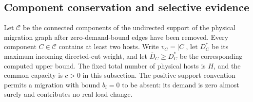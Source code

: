 \documentclass[11pt]{article}
\begin{document}
\subsection{Component conservation and selective evidence}
Let $\mathcal C$ be the connected components of the undirected support of the physical migration graph after zero-demand-bound edges have been removed. Every component $C\in\mathcal C$ contains at least two hosts. Write $v_C=|C|$, let $D_C^*$ be its maximum incoming directed-cut weight, and let $\overline D_C\ge D_C^*$ be the corresponding computed upper bound. The fixed total number of physical hosts is $H$, and the common capacity is $c>0$ in this subsection. The positive support convention permits a migration with bound $b_i=0$ to be absent: its demand is zero almost surely and contributes no real load change.
\end{document}

